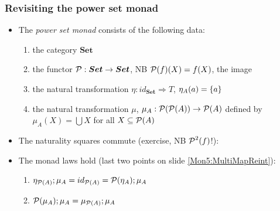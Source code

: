 \documentclass[handout]{beamer}
\newcommand{\To}{\Rightarrow}
\newcommand{\bfsf}[1]{{\boldsymbol{#1}}}
\newcommand{\Set}{\bfsf{Set}}
\begin{document}
\frame
  {   
    \frametitle{Revisiting the power set monad}\label{Mon5:PowSetMonad}

 \begin{itemize}[<+->]
\item The \emph{power set monad} consists of the following data:
 \begin{enumerate}
    \item the category $\Set$
    \item the functor $\powset:\Set\to\Set$, NB $\operatorname{\mathcal{P}}(f)(X) = f(X)$, the {\color{red}image}
    \item the natural transformation $\eta: id_\Set \To T$, $\eta_A(a)=\{a\}$
    \item the natural transformation $\mu$, 
$\mu_A: \operatorname{\mathcal{P}}(\operatorname{\mathcal{P}}(A)) \to \operatorname{\mathcal{P}}(A) $ defined by 
$\mu_A(X) = \bigcup X$ for all $X\subseteq\operatorname{\mathcal{P}}(A)$
 \end{enumerate}
\item The naturality squares commute (exercise, NB $\operatorname{\mathcal{P}}^2(f)$!):
\item The monad laws hold (last two points on slide \ref{Mon5:MultiMapReint}):
 \begin{enumerate}
    \item $\eta_{\operatorname{\mathcal{P}}(A)};\mu_A = id_{\operatorname{\mathcal{P}}(A)} = \operatorname{\mathcal{P}}(\eta_A);\mu_A$
    \item $\operatorname{\mathcal{P}}(\mu_A);\mu_A = \mu_{\operatorname{\mathcal{P}}(A)};\mu_A$
 \end{enumerate}
 \end{itemize}

 }
\end{document}
